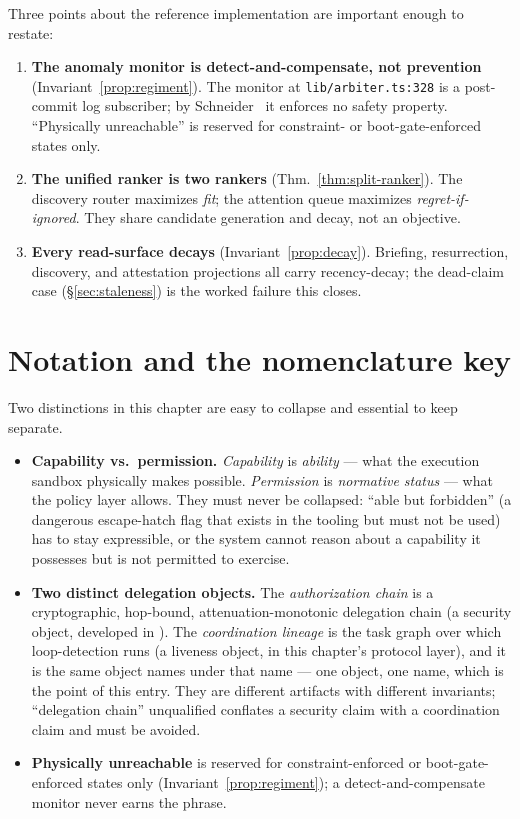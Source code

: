 \documentclass[11pt,a4paper]{article}
\theoremstyle{definition}
\theoremstyle{plain}
\newcounter{protocol}[section]
\begin{document}
Three points about the reference implementation are important enough to restate:
\begin{enumerate}[leftmargin=1.5em]
\item \textbf{The anomaly monitor is detect-and-compensate, not prevention}
(Invariant~\ref{prop:regiment}). The monitor at \texttt{lib/arbiter.ts:328} is a
post-commit log subscriber; by Schneider~ it enforces no safety
property. ``Physically unreachable'' is reserved for constraint- or boot-gate-enforced
states only.
\item \textbf{The unified ranker is two rankers} (Thm.~\ref{thm:split-ranker}). The
discovery router maximizes \emph{fit}; the attention queue maximizes
\emph{regret-if-ignored}. They share candidate generation and decay, not an objective.
\item \textbf{Every read-surface decays} (Invariant~\ref{prop:decay}). Briefing,
resurrection, discovery, and attestation projections all carry recency-decay; the
dead-claim case (\S\ref{sec:staleness}) is the worked failure this closes.
\end{enumerate}

\section{Notation and the nomenclature key}\label{app:notation}

Two distinctions in this chapter are easy to collapse and essential to keep separate.

\begin{itemize}[leftmargin=1.4em]
\item \textbf{Capability vs.\ permission.} \emph{Capability} is \emph{ability} --- what
the execution sandbox physically makes possible. \emph{Permission} is \emph{normative
status} --- what the policy layer allows. They must never be collapsed: ``able but
forbidden'' (a dangerous escape-hatch flag that exists in the tooling but must not be
used) has to stay expressible, or the system cannot reason about a capability it
possesses but is not permitted to exercise.
\item \textbf{Two distinct delegation objects.} The \emph{authorization chain} is a
cryptographic, hop-bound, attenuation-monotonic delegation chain (a security object,
developed in ). The \emph{coordination lineage} is the
task graph over which loop-detection runs (a liveness object, in this chapter's
protocol layer), and it is the same object 
names under that name --- one object, one name, which is the point of this entry.
They are different artifacts with different invariants; ``delegation
chain'' unqualified conflates a security claim with a coordination claim and must be
avoided.
\item \textbf{Physically unreachable} is reserved for constraint-enforced or
boot-gate-enforced states only (Invariant~\ref{prop:regiment}); a detect-and-compensate
monitor never earns the phrase.
\end{itemize}
\end{document}
